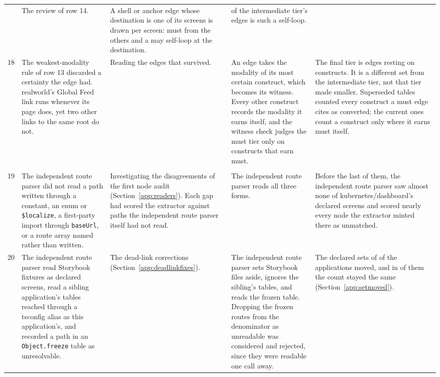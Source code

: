 \begin{xltabular}{\textwidth}{@{}rYYYY@{}}
  & The review of row 14.
  & A shell or anchor edge whose destination is one of its screens is drawn per screen: must from the others and a may self-loop at the destination.
  & \MustFateSelfLoop{} of the intermediate tier's edges is such a self-loop. \\
18 & The weakest-modality rule of row 13 discarded a certainty the edge had. realworld's Global Feed link runs whenever its page does, yet two other links to the same root do not.
  & Reading the edges that survived.
  & An edge takes the modality of its most certain construct, which becomes its witness. Every other construct records the modality it earns itself, and the witness check judges the must tier only on constructs that earn must.
  & The final tier is \CensusMust{} edges resting on \CensusMustSites{} constructs. It is a different set from the intermediate tier, not that tier made smaller. Superseded tables counted every construct a must edge cites as converted; the current ones count a construct only where it earns must itself. \\
\addlinespace
{} \\
19 & The independent route parser did not read a path written through a constant, an enum or \texttt{\$localize}, a first-party import through \texttt{baseUrl}, or a route array named rather than written.
  & Investigating the disagreements of the first node audit (Section~\ref{app:readers}). Each gap had scored the extractor against paths the independent route parser itself had not read.
  & The independent route parser reads all three forms.
  & Before the last of them, the independent route parser saw almost none of kubernetes/dashboard's declared screens and scored nearly every node the extractor minted there as unmatched. \\
20 & The independent route parser read Storybook fixtures as declared screens, read a sibling application's tables reached through a tsconfig alias as this application's, and recorded a path in an \texttt{Object.freeze} table as unresolvable.
  & The dead-link corrections (Section~\ref{app:deadlinkfixes}).
  & The independent route parser sets Storybook files aside, ignores the sibling's tables, and reads the frozen table. Dropping the frozen routes from the denominator as unreadable was considered and rejected, since they were readable one call away.
  & The declared sets of \RoundTwoSetMoved{} of the \CensusApps{} applications moved, and in \RoundTwoSetMovedCountSame{} of them the count stayed the same (Section~\ref{app:setmoved}). \\

\end{xltabular}
